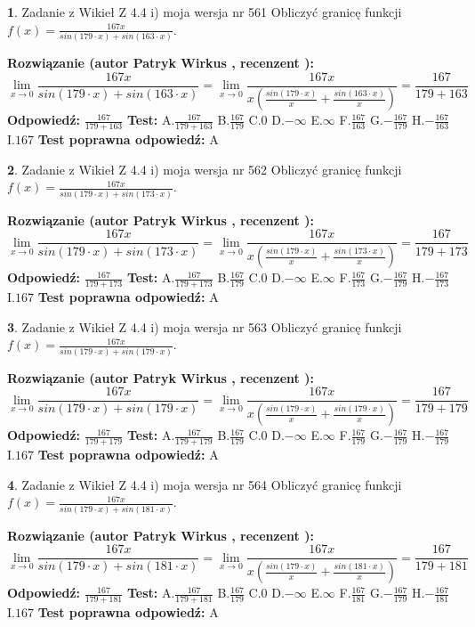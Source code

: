 \documentclass[12pt, a4paper]{article}
\theoremstyle{definition} %
\newtheorem{zad}{}
\newcommand{\zadStart}[1]{\begin{zad}#1\newline}
\newcommand{\zadStop}{\end{zad}}
\newcommand{\rozwStart}[2]{\noindent \textbf{Rozwiązanie (autor #1 , recenzent #2): }\newline}
\newcommand{\rozwStop}{\newline}
\newcommand{\odpStart}{\noindent \textbf{Odpowiedź:}\newline}
\newcommand{\odpStop}{\newline}
\newcommand{\testStart}{\noindent \textbf{Test:}\newline}
\newcommand{\testStop}{\newline}
\newcommand{\kluczStart}{\noindent \textbf{Test poprawna odpowiedź:}\newline}
\newcommand{\kluczStop}{\newline}
\begin{document}
\zadStart{Zadanie z Wikieł Z 4.4 i) moja wersja nr 561}
Obliczyć granicę funkcji $f(x)=\frac{167x}{sin(179\cdot x) +sin(163\cdot x)}$.
\zadStop
\rozwStart{Patryk Wirkus}{}
$$\lim\limits_{x\to 0}\frac{167x}{sin(179\cdot x) +sin(163\cdot x)}=\lim\limits_{x\to 0}\frac{167x}{x(\frac{sin(179\cdot x)}{x}+\frac{sin(163\cdot x)}{x})}=\frac{167}{179+163}$$
\rozwStop
\odpStart
$\frac{167}{179+163}$
\odpStop
\testStart
A.$\frac{167}{179+163}$
B.$\frac{167}{179}$
C.$0$
D.$-\infty$
E.$\infty$
F.$\frac{167}{163}$
G.$-\frac{167}{179}$
H.$-\frac{167}{163}$
I.$167$
\testStop
\kluczStart
A
\kluczStop



\zadStart{Zadanie z Wikieł Z 4.4 i) moja wersja nr 562}
Obliczyć granicę funkcji $f(x)=\frac{167x}{sin(179\cdot x) +sin(173\cdot x)}$.
\zadStop
\rozwStart{Patryk Wirkus}{}
$$\lim\limits_{x\to 0}\frac{167x}{sin(179\cdot x) +sin(173\cdot x)}=\lim\limits_{x\to 0}\frac{167x}{x(\frac{sin(179\cdot x)}{x}+\frac{sin(173\cdot x)}{x})}=\frac{167}{179+173}$$
\rozwStop
\odpStart
$\frac{167}{179+173}$
\odpStop
\testStart
A.$\frac{167}{179+173}$
B.$\frac{167}{179}$
C.$0$
D.$-\infty$
E.$\infty$
F.$\frac{167}{173}$
G.$-\frac{167}{179}$
H.$-\frac{167}{173}$
I.$167$
\testStop
\kluczStart
A
\kluczStop



\zadStart{Zadanie z Wikieł Z 4.4 i) moja wersja nr 563}
Obliczyć granicę funkcji $f(x)=\frac{167x}{sin(179\cdot x) +sin(179\cdot x)}$.
\zadStop
\rozwStart{Patryk Wirkus}{}
$$\lim\limits_{x\to 0}\frac{167x}{sin(179\cdot x) +sin(179\cdot x)}=\lim\limits_{x\to 0}\frac{167x}{x(\frac{sin(179\cdot x)}{x}+\frac{sin(179\cdot x)}{x})}=\frac{167}{179+179}$$
\rozwStop
\odpStart
$\frac{167}{179+179}$
\odpStop
\testStart
A.$\frac{167}{179+179}$
B.$\frac{167}{179}$
C.$0$
D.$-\infty$
E.$\infty$
F.$\frac{167}{179}$
G.$-\frac{167}{179}$
H.$-\frac{167}{179}$
I.$167$
\testStop
\kluczStart
A
\kluczStop



\zadStart{Zadanie z Wikieł Z 4.4 i) moja wersja nr 564}
Obliczyć granicę funkcji $f(x)=\frac{167x}{sin(179\cdot x) +sin(181\cdot x)}$.
\zadStop
\rozwStart{Patryk Wirkus}{}
$$\lim\limits_{x\to 0}\frac{167x}{sin(179\cdot x) +sin(181\cdot x)}=\lim\limits_{x\to 0}\frac{167x}{x(\frac{sin(179\cdot x)}{x}+\frac{sin(181\cdot x)}{x})}=\frac{167}{179+181}$$
\rozwStop
\odpStart
$\frac{167}{179+181}$
\odpStop
\testStart
A.$\frac{167}{179+181}$
B.$\frac{167}{179}$
C.$0$
D.$-\infty$
E.$\infty$
F.$\frac{167}{181}$
G.$-\frac{167}{179}$
H.$-\frac{167}{181}$
I.$167$
\testStop
\kluczStart
A
\kluczStop
\end{document}
